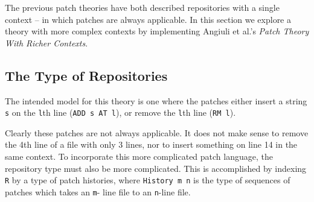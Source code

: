 The previous patch theories have both described repositories with a single context --
in which patches are always applicable. In this section we explore a theory with more
complex contexts by implementing Angiuli et al.'s \emph{Patch Theory With Richer Contexts}.

\subsection{The Type of Repositories}
The intended model for this theory is one where the patches either insert a string \texttt{s} on the
\texttt{l}th line (\texttt{ADD s AT l}), or remove the \texttt{l}th line (\texttt{RM l}).

Clearly these patches are not always applicable. It does not make sense to remove the 4th line of a file
with only 3 lines, nor to insert something on line 14 in the same context.
To incorporate this more complicated patch language, the repository type must also be more complicated.
This is accomplished by indexing \texttt{R} by a type
of patch histories, where \texttt{History m n} is the type of sequences of patches which takes an \texttt{m}-
line file to an \texttt{n}-line file.

